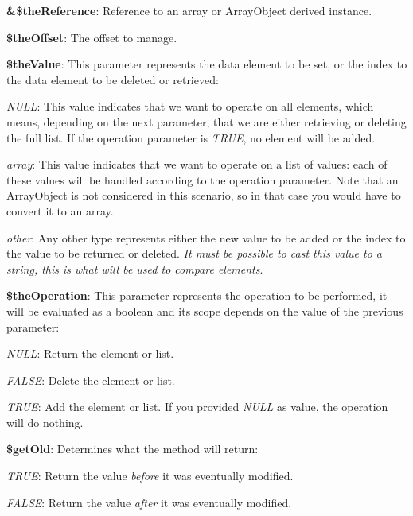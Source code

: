 \begin{DoxyItemize}
\item {\bfseries \&\$the\-Reference}\-: Reference to an array or Array\-Object derived instance. 
\item {\bfseries \$the\-Offset}\-: The offset to manage. 
\item {\bfseries \$the\-Value}\-: This parameter represents the data element to be set, or the index to the data element to be deleted or retrieved\-: 
\begin{DoxyItemize}
\item {\itshape N\-U\-L\-L}\-: This value indicates that we want to operate on all elements, which means, depending on the next parameter, that we are either retrieving or deleting the full list. If the operation parameter is {\itshape T\-R\-U\-E}, no element will be added. 
\item {\itshape array}\-: This value indicates that we want to operate on a list of values\-: each of these values will be handled according to the operation parameter. Note that an Array\-Object is not considered in this scenario, so in that case you would have to convert it to an array. 
\item {\itshape other}\-: Any other type represents either the new value to be added or the index to the value to be returned or deleted. {\itshape It must be possible to cast this value to a string, this is what will be used to compare elements}. 
\end{DoxyItemize}
\item {\bfseries \$the\-Operation}\-: This parameter represents the operation to be performed, it will be evaluated as a boolean and its scope depends on the value of the previous parameter\-: 
\begin{DoxyItemize}
\item {\itshape N\-U\-L\-L}\-: Return the element or list. 
\item {\itshape F\-A\-L\-S\-E}\-: Delete the element or list. 
\item {\itshape T\-R\-U\-E}\-: Add the element or list. If you provided {\itshape N\-U\-L\-L} as value, the operation will do nothing. 
\end{DoxyItemize}
\item {\bfseries \$get\-Old}\-: Determines what the method will return\-: 
\begin{DoxyItemize}
\item {\itshape T\-R\-U\-E}\-: Return the value {\itshape before} it was eventually modified. 
\item {\itshape F\-A\-L\-S\-E}\-: Return the value {\itshape after} it was eventually modified. 
\end{DoxyItemize}
\end{DoxyItemize}


